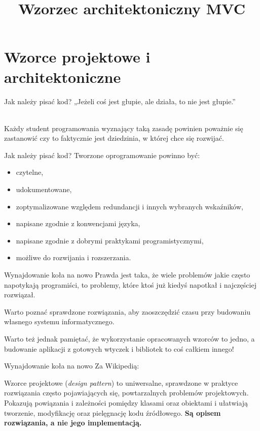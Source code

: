 

\title{Wzorzec architektoniczny MVC}



\section{Wzorce projektowe i architektoniczne}

\begin{frame}{Jak należy pisać kod?}
	„Jeżeli coś jest głupie, ale działa, to nie jest głupie.''
	
	\ \\
	
	Każdy student programowania wyznający taką zasadę powinien poważnie się zastanowić czy to faktycznie jest dziedzinia, w której chce się rozwijać.
\end{frame}

\begin{frame}{Jak należy pisać kod?}
	Tworzone oprogramowanie powinno być:
	\begin{itemize}
		\item czytelne,
		\item udokumentowane,
		\item zoptymalizowane względem redundancji i innych wybranych wskaźników,
		\item napisane zgodnie z konwencjami języka,
		\item napisane zgodnie z dobrymi praktykami programistycznymi,
		\item możliwe do rozwijania i rozszerzania.
	\end{itemize}
\end{frame}

\begin{frame}{Wynajdowanie koła na nowo}
	Prawda jest taka, że wiele problemów jakie często napotykają programiści, to problemy, które ktoś już kiedyś napotkał i najczęściej rozwiązał.
	
	Warto poznać sprawdzone rozwiązania, aby zaoszczędzić czasu przy budowaniu własnego systemu informatycznego. 
	
	Warto też jednak pamiętać, że wykorzystanie opracowanych wzorców to jedno, a budowanie aplikacji z gotowych wtyczek i bibliotek to coś całkiem innego!
\end{frame}

\begin{frame}{Wynajdowanie koła na nowo}
	Za Wikipedią:
	
	 Wzorce projektowe (\emph{design pattern}) to uniwersalne, sprawdzone w praktyce rozwiązania często pojawiających się, powtarzalnych problemów projektowych. Pokazują powiązania i zależności pomiędzy klasami oraz obiektami i ułatwiają tworzenie, modyfikację oraz pielęgnację kodu źródłowego.\textbf{ Są opisem rozwiązania, a nie jego implementacją.}
\end{frame}

